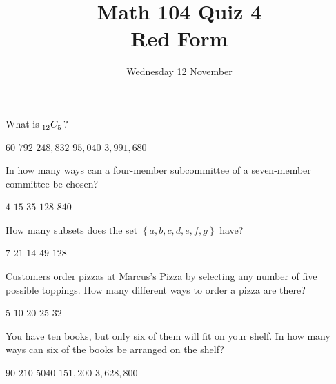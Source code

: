 \documentclass[answers,12pt]{exam}
\title{Math 104 Quiz 4\\Red Form}
\date{Wednesday 12 November}
\newcommand\ncr[2]{\tensor[_{#1}]C{_{#2}}}
\begin{document}
\maketitle
\begin{center}
\end{center}

\begin{questions}

\question What is $\ncr{12}{5}$?\\
\begin{oneparchoices}
\choice $60$ %
\correctchoice $792$
\choice $248,832$ %
\choice $95,040$ %
\choice $3,991,680$ %
\end{oneparchoices}

\question In how many ways can a four-member subcommittee
of a seven-member committee be chosen?\\
\begin{oneparchoices}
\choice $4$ %
\choice $15$ %
\correctchoice $35$
\choice $128$ %
\choice $840$ %
\end{oneparchoices}

\question How many subsets does the set
$\left\{a,b,c,d,e,f,g\right\}$ have?\\
\begin{oneparchoices}
\choice $7$ %
\choice $21$ %
\choice $14$ %
\choice $49$ %
\correctchoice $128$
\end{oneparchoices}

\question Customers order pizzas at Marcus's Pizza
by selecting any number of five possible toppings.
How many different ways to order a pizza are there?\\
\begin{oneparchoices}
\choice $5$ %
\choice $10$ %
\choice $20$ %
\choice $25$ %
\correctchoice $32$
\end{oneparchoices}

\question You have ten books, but only six
of them will fit on your shelf. In how many 
ways can six of the books be arranged on the shelf?\\
\begin{oneparchoices}
\choice $90$ %
\choice $210$ %
\choice $5040$ %
\correctchoice $151,200$
\choice $3,628,800$ %
\end{oneparchoices}


\end{questions}
\end{document}

